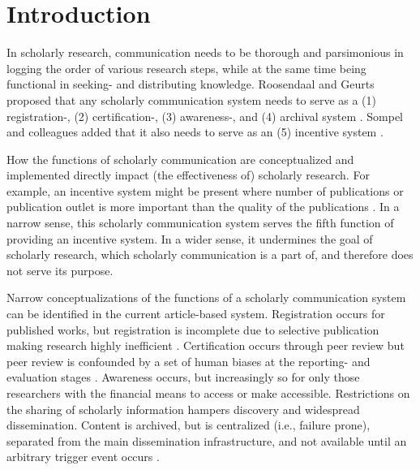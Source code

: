 \documentclass[publications,article,submit,moreauthors,pdftex,10pt,a4paper]{Definitions/mdpi}
\begin{document}

\section*{Introduction}

In scholarly research, communication needs to be thorough and
parsimonious in logging the order of various research steps, while at
the same time being functional in seeking- and distributing knowledge.
Roosendaal and Geurts proposed that any scholarly communication system
needs to serve as a (1) registration-, (2) certification-, (3)
awareness-, and (4) archival system \citep{roosendaal1998}. Sompel
and colleagues added that it also needs to serve as an (5) incentive
system \citep{doi:10.1045/september2004-vandesompel}.

How the functions of scholarly communication are conceptualized and
implemented directly impact (the effectiveness of) scholarly research.
For example, an incentive system might be present where number of
publications or publication outlet is more important than the quality of
the publications \citep{doi:10.3389/fnhum.2018.00037}. In a narrow sense, this scholarly
communication system serves the fifth function of providing an incentive
system. In a wider sense, it undermines the goal of scholarly research,
which scholarly communication is a part of, and therefore does not serve
its purpose.

Narrow conceptualizations of the functions of a scholarly
communication system can be identified in the current article-based
system.  Registration occurs for published works, but registration is
incomplete due to selective publication 
\citep[e.g., 1 out of 2 registered
clinical trials gets published;][]{doi:10.1016/0140-6736_91_90201-y} making research highly
inefficient \citep{doi:10.1371/journal.pone.0084896}. Certification
occurs through peer review \citep{doi:10.1038/nature05008} but peer
review is confounded by a set of human biases at the reporting- and
evaluation stages \citep[e.g., methods are evaluated as of higher quality
when they result in statistically significant results than when in
statistically nonsignificant results;][]{doi:10.1007/bf01173636}. Awareness occurs, but increasingly so
for only those researchers with the financial means to access or make
accessible.  Restrictions on the sharing of scholarly information
hampers discovery and widespread dissemination. Content is archived,
but is centralized (i.e., failure prone), separated from the main
dissemination infrastructure, and not available until an arbitrary
trigger event occurs \citep[i.e., a dark archive;][]{doi:10.1629/uksg.215}.
\end{document}
